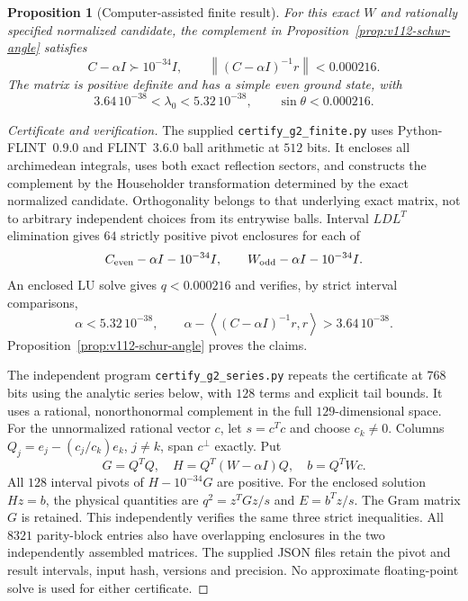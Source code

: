 \documentclass[11pt]{article}
\newtheorem{proposition}[theorem]{Proposition}
\theoremstyle{remark}
\newcommand{\norm}[1]{\left\lVert #1\right\rVert}
\newcommand{\ip}[2]{\left\langle #1,#2\right\rangle}
\begin{document}
\begin{proposition}[Computer-assisted finite result]
\label{prop:v112-finite-certificate}
For this exact $W$ and rationally specified normalized candidate,
the complement in Proposition~\ref{prop:v112-schur-angle} satisfies
\[
 C-\alpha I\succ10^{-34}I,\qquad
 \norm{(C-\alpha I)^{-1}r}<0.000216.
\]
The matrix is positive definite and has a simple even ground state, with
\begin{equation}\label{eq:v112-certified-bottom}
 3.64\,10^{-38}<\lambda_0<5.32\,10^{-38},
 \qquad \sin\theta<0.000216.
\end{equation}
\end{proposition}
\begin{proof}[Certificate and verification]
The supplied \texttt{certify\_g2\_finite.py} uses
Python-FLINT~0.9.0 and FLINT~3.6.0 ball arithmetic
\cite{PythonFlint2026} at $512$ bits. It encloses all archimedean
integrals, uses both exact reflection sectors, and constructs the
complement by the Householder transformation determined by the exact
normalized candidate. Orthogonality belongs to that underlying exact
matrix, not to arbitrary independent choices from its entrywise balls.
Interval $LDL^T$ elimination gives $64$ strictly positive pivot
enclosures for each of
\[
 C_{\rm even}-\alpha I-10^{-34}I,
 \qquad W_{\rm odd}-\alpha I-10^{-34}I.
\]
An enclosed LU solve gives $q<0.000216$ and verifies, by strict
interval comparisons,
\[
 \alpha<5.32\,10^{-38},\qquad
 \alpha-\ip{(C-\alpha I)^{-1}r}{r}>3.64\,10^{-38}.
\]
Proposition~\ref{prop:v112-schur-angle} proves the claims.

The independent program \texttt{certify\_g2\_series.py} repeats the
certificate at $768$ bits using the analytic series below, with $128$
terms and explicit tail bounds. It uses a rational, nonorthonormal
complement in the full $129$-dimensional space. For the unnormalized
rational vector $c$, let $s=c^Tc$ and choose $c_k\ne0$. Columns
$Q_j=e_j-(c_j/c_k)e_k$, $j\ne k$, span $c^\perp$ exactly. Put
\[
 G=Q^TQ,\quad H=Q^T(W-\alpha I)Q,\quad b=Q^TWc.
\]
All $128$ interval pivots of $H-10^{-34}G$ are positive.
For the enclosed solution $Hz=b$, the physical quantities are
$q^2=z^TGz/s$ and $E=b^Tz/s$. The Gram matrix $G$ is retained.
This independently verifies the same three strict inequalities.
All $8321$ parity-block entries also have overlapping enclosures in the
two independently assembled matrices. The supplied JSON files retain
the pivot and result intervals, input hash, versions and precision.
No approximate floating-point solve is used for either certificate.
\end{proof}
\end{document}
